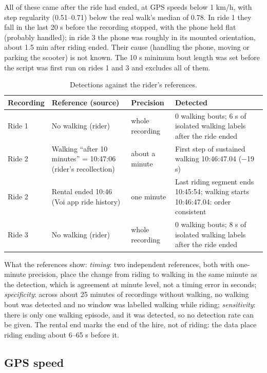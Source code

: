 All of these came after the ride had ended, at GPS speeds below 1 km/h, with step
regularity (0.51--0.71) below the real walk's median of 0.78. In ride 1 they fall in the
last 20 s before the recording stopped, with the phone held flat (probably handled); in
ride 3 the phone was roughly in its mounted orientation, about 1.5 min after riding ended.
Their cause (handling the phone, moving or parking the scooter) is not known. The 10 s
minimum bout length was set before the script was first run on rides 1 and 3 and excludes
all of them.

\begin{table}[htbp]
\centering\small
\caption{Detections against the rider's references.}\label{tab:Bref}
\begin{tabular}{@{}lp{42mm}p{24mm}p{58mm}@{}}
\toprule
Recording & Reference (source) & Precision & Detected \\
\midrule
Ride 1 & No walking (rider) & whole recording & 0 walking bouts; 6 s of isolated walking labels after the ride ended \\
Ride 2 & Walking ``after 10 minutes'' = 10:47:06 (rider's recollection) & about a minute & First step of sustained walking 10:46:47.04 (−19 s) \\
Ride 2 & Rental ended 10:46 (Voi app ride history) & one minute & Last riding segment ends 10:45:54; walking starts 10:46:47.04: order consistent \\
Ride 3 & No walking (rider) & whole recording & 0 walking bouts; 8 s of isolated walking labels after the ride ended \\
\bottomrule
\end{tabular}
\end{table}

What the references show: \emph{timing}: two independent references, both with one-minute
precision, place the change from riding to walking in the same minute as the detection,
which is agreement at minute level, not a timing error in seconds; \emph{specificity}:
across about 25 minutes of recordings without walking, no walking bout was detected and
no window was labelled walking while riding; \emph{sensitivity}: there is only one walking
episode, and it was detected, so no detection rate can be given. The rental end marks the
end of the hire, not of riding: the data place riding ending about 6--65 s before it.

\subsection{GPS speed}

